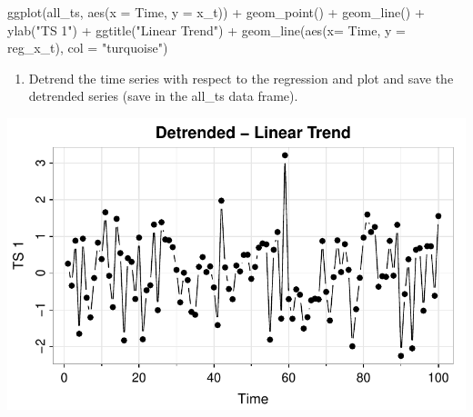 \documentclass[
  letterpaper,
  DIV=11,
  numbers=noendperiod]{scrartcl}
\newenvironment{Shaded}{\begin{snugshade}}{\end{snugshade}}
\newcommand{\AttributeTok}[1]{\textcolor[rgb]{0.40,0.45,0.13}{#1}}
\newcommand{\DecValTok}[1]{\textcolor[rgb]{0.68,0.00,0.00}{#1}}
\newcommand{\FunctionTok}[1]{\textcolor[rgb]{0.28,0.35,0.67}{#1}}
\newcommand{\NormalTok}[1]{\textcolor[rgb]{0.00,0.23,0.31}{#1}}
\newcommand{\OtherTok}[1]{\textcolor[rgb]{0.00,0.23,0.31}{#1}}
\newcommand{\SpecialCharTok}[1]{\textcolor[rgb]{0.37,0.37,0.37}{#1}}
\newcommand{\StringTok}[1]{\textcolor[rgb]{0.13,0.47,0.30}{#1}}
\providecommand{\tightlist}{%
  \setlength{\itemsep}{0pt}\setlength{\parskip}{0pt}}\usepackage{longtable,booktabs,array}
\begin{document}
\begin{Shaded}
\begin{Highlighting}[]
\FunctionTok{ggplot}\NormalTok{(all\_ts, }\FunctionTok{aes}\NormalTok{(}\AttributeTok{x =}\NormalTok{ Time, }\AttributeTok{y =}\NormalTok{ x\_t)) }\SpecialCharTok{+} \FunctionTok{geom\_point}\NormalTok{() }\SpecialCharTok{+} \FunctionTok{geom\_line}\NormalTok{() }\SpecialCharTok{+} 
  \FunctionTok{ylab}\NormalTok{(}\StringTok{"TS 1"}\NormalTok{) }\SpecialCharTok{+} \FunctionTok{ggtitle}\NormalTok{(}\StringTok{"Linear Trend"}\NormalTok{) }\SpecialCharTok{+} \FunctionTok{geom\_line}\NormalTok{(}\FunctionTok{aes}\NormalTok{(}\AttributeTok{x=}\NormalTok{ Time, }\AttributeTok{y =}\NormalTok{ reg\_x\_t), }\AttributeTok{col =} \StringTok{"turquoise"}\NormalTok{) }
\end{Highlighting}
\end{Shaded}

\begin{enumerate}
\def\labelenumi{\arabic{enumi}.}
\setcounter{enumi}{5}
\tightlist
\item
  Detrend the time series with respect to the regression and plot and
  save the detrended series (save in the all\_ts data frame).
\end{enumerate}

\begin{Shaded}
\end{Shaded}

\includegraphics{Lecture7_files/figure-pdf/astsa-act2-p6-1.pdf}
\end{document}
